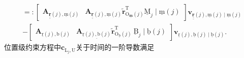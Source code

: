 \[\begin{array}{l}
=:\left[\begin{array}{ll}
\boldsymbol{A}_{\underline{\underline{\mathbf{r}}}(j), \underline{\mathrm{m}}(j)} & \boldsymbol{A}_{\underline{\underline{\mathbf{r}}}(j), \underline{\mathrm{m}}(j)} \tilde{\boldsymbol{r}}_{\mathrm{O}_{\underline{\mathbf{m}}}(j)}^{\mathrm{T}} \underline{\mathrm{M}}_{j} \mid \underline{\mathrm{m}}(j)
\end{array}\right] \boldsymbol{v}_{\underline{\underline{\mathbf{r}}}(j), \underline{\mathrm{m}}(j) \mid \underline{\mathrm{m}}(j)} \\
-\left[\begin{array}{ll}
\boldsymbol{A}_{\underline{\mathrm{r}}(j), \mathrm{b}(j)} & \boldsymbol{A}_{\underline{\underline{\mathrm{r}}(j), \mathrm{b}(j)}} \tilde{\boldsymbol{r}}_{\mathrm{O}_{\underline{\mathrm{b}}}(j)}^{\mathrm{T}} \underline{\mathrm{~B}}_{j} \mid \underline{\mathrm{b}}(j)
\end{array}\right] \boldsymbol{v}_{\underline{\mathrm{r}}(j), \underline{\mathrm{b}}(j) \mid \underline{\mathrm{b}}(j)} .
\end{array}
\]
位置级约束方程中$\boldsymbol{c}_{\mathrm{L}_{j}, \mathrm{U}}$关于时间的一阶导数满足

